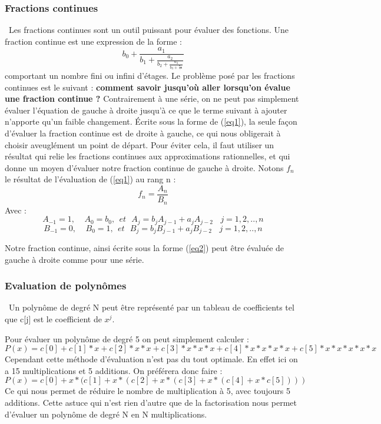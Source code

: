 \documentclass{article}
\begin{document}
\subsubsection{Fractions continues}
\
\indent Les fractions continues sont un outil puissant pour évaluer des fonctions. Une fraction continue est une expression de la forme :
\begin{equation} \label{eq1}
b_0+\frac{a_1}{b_1+\frac{a_2}{b_2+\frac{a_3}{b_3+\frac{a_4}{..}}}}
\end{equation} comportant un nombre fini ou infini d'étages.
\medbreak
Le problème posé par les fractions continues est le suivant : \textbf{comment savoir jusqu'où aller lorsqu'on évalue une fraction continue ?}
\medbreak
Contrairement à une série, on ne peut pas simplement évaluer l'équation de gauche à droite jusqu'à ce que le terme suivant à ajouter n'apporte qu'un faible changement. Écrite sous la forme de (\ref{eq1}), la seule façon d'évaluer la fraction continue est de droite à gauche, ce qui nous obligerait à choisir aveuglément un point de départ. Pour éviter cela, il faut utiliser un résultat qui relie les fractions continues aux approximations rationnelles, et qui donne un moyen d'évaluer notre fraction continue de gauche à droite. Notons $f_n$ le résultat de l'évaluation de (\ref{eq1}) au rang n :
\begin{equation} \label{eq2}
    f_n=\frac{A_n}{B_n}
\end{equation}
Avec :
\begin{equation}
    A_{-1}=1,\ \ \ \ \ A_0=b_0,\ \ et \ \ \ A_j=b_jA_{j-1}+a_jA_{j-2}\ \ \ \ j=1,2,..,n
\end{equation}
\begin{equation}
    B_{-1}=0,\ \ \ \ \ B_0=1,\ \ et \ \ \  B_j=b_jB_{j-1}+a_jB_{j-2}\ \ \ \ j=1,2,..,n
\end{equation}

Notre fraction continue, ainsi écrite sous la forme (\ref{eq2}) peut être évaluée de gauche à droite comme pour une série.


\subsubsection{Evaluation de polynômes}
\
\indent Un polynôme de degré N peut être représenté par un tableau de coefficients tel que c[j] est le coefficient de $x^j$. 

Pour évaluer un polynôme de degré 5 on peut simplement calculer :
\begin{equation}
    P(x)=c[0]+c[1]*x+c[2]*x*x+c[3]*x*x*x+c[4]*x*x*x*x+c[5]*x*x*x*x*x
\end{equation}
\indent Cependant cette méthode d'évaluation n'est pas du tout optimale. En effet ici on a 15 multiplications et 5 additions. On préférera donc faire : 
\begin{equation}
    P(x)=c[0]+x*(c[1]+x*(c[2]+x*(c[3]+x*(c[4]+x*c[5])))
\end{equation}
\indent Ce qui nous permet de réduire le nombre de multiplication à 5, avec toujours 5 additions. Cette astuce qui n'est rien d'autre que de la factorisation nous permet d'évaluer un polynôme de degré N en N multiplications.
\end{document}
